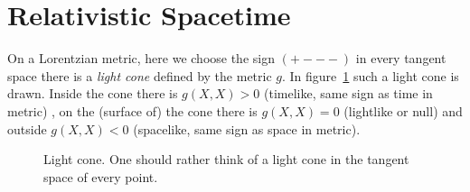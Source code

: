 \documentclass[11pt, a4paper, twocolumn]{article} %
\begin{document}
    \section{Relativistic Spacetime}

    On a Lorentzian metric, here we choose the sign $(+---)$ in every tangent space
    there is a \textit{light cone} defined by the metric $g$.
    In figure~\ref{fig:lightCone} such a light cone is drawn.
    Inside the cone there is $g(X,X)>0$ (timelike, same sign as time in metric)
    , on the (surface of) the cone there is
    $g(X,X)=0$ (lightlike or null) and outside $g(X,X)<0$ (spacelike, same sign as space
    in metric).
    \begin{figure}[tbh]
        \centering\def\svgwidth{\columnwidth}
        
        \caption{Light cone. One should rather think of a light cone in the tangent space of every
        point.}
        \label{fig:lightCone}
    \end{figure}
\end{document}
